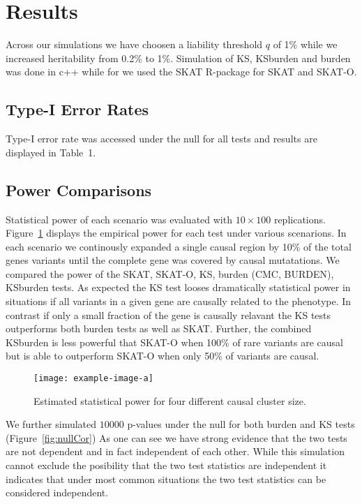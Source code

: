 \section{Results}
\label{sec:results}

Across our simulations we have choosen a liability threshold $q$ of 1\% while we increased heritability from 0.2\% to 1\%.
Simulation of KS, KSburden and burden was done in c++ while for we used the SKAT R-package for SKAT and SKAT-O. %

\subsection{Type-I Error Rates}
\label{sub:type_i_error_rates}

Type-I error rate was accessed under the null for all tests and results are displayed in Table~1. 

\subsection{Power Comparisons}
\label{sub:power_comparisons}

Statistical power of each scenario was evaluated with $10\times 100$ replications.
Figure~\ref{fig:simulatedGeneRealData} displays the empirical power for each test under various scenarions.
In each scenario we continously expanded a single causal region by 10\% of the total genes variants until the complete gene was covered by causal mutatations.
We compared the power of the SKAT, SKAT-O, KS, burden (CMC, BURDEN), KSburden tests.
As expected the KS test looses dramatically statistical power in situations if all variants in a given gene are causally related to the phenotype.
In contrast if only a small fraction of the gene is causally relavant the KS tests outperforms both burden tests as well as SKAT.
Further, the combined KSburden is less powerful that SKAT-O when 100\% of rare variants are causal but is able to outperform SKAT-O when only 50\% of variants are causal.

\begin{figure}[ht!]
	\centering
	\texttt{[image: example-image-a]}
	\caption{Estimated statistical power for four different causal cluster size.\label{fig:simulatedGeneRealData}}
\end{figure}

We further simulated $10000$ p-values under the null for both burden and KS tests (Figure~\ref{fig:nullCor})
As one can see we have strong evidence that the two tests are not dependent and in fact independent of each other.
While this simulation cannot exclude the posibility that the two test statistics are independent it indicates that under most common situations the two test statistics can be considered independent.

